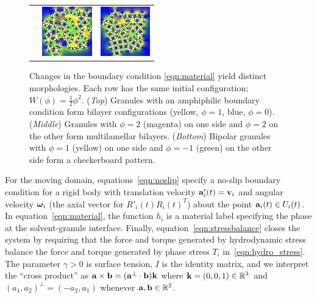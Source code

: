 \begin{figure}
\begin{center}
\begin{tabular}{m{0.9in}m{0.9in}m{0.9in}}
      &\includegraphics[width=0.85in]{figures/SpecificAim1/N100A2.jpg}
      &\includegraphics[width=0.85in]{figures/SpecificAim1/N100A3.jpg} 
  \end{tabular}
  \end{center}
  \vspace{-20pt}
  \caption{\footnotesize \label{fig:self-assembly2} Changes in the
  boundary condition \eqref{eqn:material} yield distinct morphologies.
  Each row has the same initial configuration; $W(\phi) =
  \tfrac{1}{2}\phi^2$. (\emph{Top}) Granules with an amphiphilic
  boundary condition form bilayer configurations (yellow, $\phi = 1$,
  blue, $\phi = 0$). (\emph{Middle}) Granules with $\phi = 2$ (magenta)
  on one side and $\phi = 2$ on the other form multilamellar bilayers.
  (\emph{Bottom}) Bipolar granules with $\phi = 1$ (yellow) on one side
  and $\phi=-1$ (green) on the other side form a checkerboard pattern.}
\end{figure}

For the moving domain, equations~\eqref{eqn:noslip}
specify a no-slip boundary condition for a rigid body with translation
velocity $\aa'_i(t) = \vv_i$ and angular velocity $\oomega_i$ (the axial
vector for $R'_i(t)R_i(t)^T$) about the point $\aa_i(t) \in U_i(t)$. In
equation~\eqref{eqn:material}, the function $h_i$ is a material label
specifying the phase at the solvent-granule interface. Finally,
equation~\eqref{eqn:stressbalance} closes the system by requiring that
the force and torque generated by hydrodynamic stress balance
the force and torque 
generated by phase stress $T_i$ in~\eqref{eqn:hydro_stress}. The
parameter $\gamma > 0$ is surface tension, $I$ is the identity matrix,
and we interpret the ``cross product'' as $\aa \times \bb = (\aa^{\perp} \cdot
\bb) \kk$ where $\kk = (0,0,1) \in \RR^3$ and $(a_1,a_2)^{\perp} =
(-a_2,a_1)$ whenever $\aa, \bb \in \mathbb{R}^2$.

